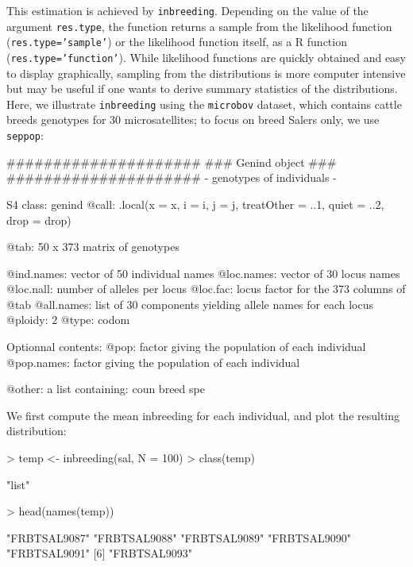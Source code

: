 \documentclass{article}
\begin{document}
This estimation is achieved by \texttt{inbreeding}.
Depending on the value of the argument \texttt{res.type}, the function returns a sample from the
likelihood function (\texttt{res.type='sample'}) or the likelihood function itself, as a R function (\texttt{res.type='function'}).
While likelihood functions are quickly obtained and easy to display graphically, sampling from the
distributions is more computer intensive but may be useful if one wants to derive summary statistics of the distributions.
Here, we illustrate \texttt{inbreeding} using the \texttt{microbov} dataset, which contains cattle
breeds genotypes for 30 microsatellites; to focus on breed Salers only, we use \texttt{seppop}:
\begin{Schunk}
\begin{Soutput}
   #####################
   ### Genind object ### 
   #####################
- genotypes of individuals - 

S4 class:  genind
@call: .local(x = x, i = i, j = j, treatOther = ..1, quiet = ..2, drop = drop)

@tab:  50 x 373 matrix of genotypes

@ind.names: vector of  50 individual names
@loc.names: vector of  30 locus names
@loc.nall: number of alleles per locus
@loc.fac: locus factor for the  373 columns of @tab
@all.names: list of  30 components yielding allele names for each locus
@ploidy:  2
@type:  codom

Optionnal contents: 
@pop:  factor giving the population of each individual
@pop.names:  factor giving the population of each individual

@other: a list containing: coun  breed  spe 
\end{Soutput}
\end{Schunk}
We first compute the mean inbreeding for each individual, and plot the resulting distribution:
\begin{Schunk}
\begin{Sinput}
> temp <- inbreeding(sal, N = 100)
> class(temp)
\end{Sinput}
\begin{Soutput}
[1] "list"
\end{Soutput}
\begin{Sinput}
> head(names(temp))
\end{Sinput}
\begin{Soutput}
[1] "FRBTSAL9087" "FRBTSAL9088" "FRBTSAL9089" "FRBTSAL9090" "FRBTSAL9091"
[6] "FRBTSAL9093"
\end{Soutput}
\end{Schunk}
\end{document}
